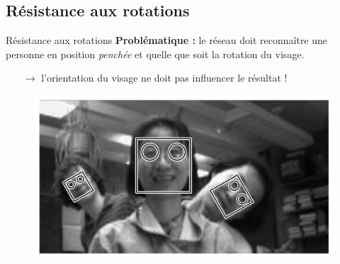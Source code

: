 \documentclass[compress]{beamer}
\begin{document}
\subsection{Résistance aux rotations}

\begin{frame}{Résistance aux rotations}
  \textbf{\color{fibeamer@orange}Problématique :} le réseau doit reconnaître une personne en position \textit{penchée} et quelle que soit la rotation du visage.
  \begin{itemize}
    \item[$\rightarrow$] l'orientation du visage ne doit pas influencer le résultat !
  \end{itemize}
  \vspace{-.03\linewidth}
  \begin{figure}
    \includegraphics[width=0.8\linewidth]{resources/rotation2}
  \end{figure}
\end{frame}
\end{document}
